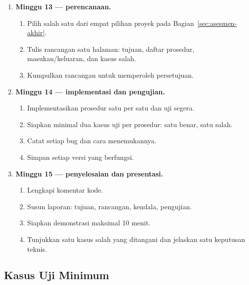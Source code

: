 \begin{enumerate}
    \item \textbf{Minggu 13 --- perencanaan.}
    \begin{enumerate}
        \item Pilih salah satu dari empat pilihan proyek pada
              Bagian~\ref{sec:asesmen-akhir}.
        \item Tulis rancangan satu halaman: tujuan, daftar prosedur,
              masukan/keluaran, dan kasus salah.
        \item Kumpulkan rancangan untuk memperoleh persetujuan.
    \end{enumerate}

    \item \textbf{Minggu 14 --- implementasi dan pengujian.}
    \begin{enumerate}
        \item Implementasikan prosedur satu per satu dan uji segera.
        \item Siapkan minimal dua kasus uji per prosedur: satu benar,
              satu salah.
        \item Catat setiap bug dan cara menemukannya.
        \item Simpan setiap versi  yang berfungsi.
    \end{enumerate}

    \item \textbf{Minggu 15 --- penyelesaian dan presentasi.}
    \begin{enumerate}
        \item Lengkapi komentar kode.
        \item Susun laporan: tujuan, rancangan, kendala, pengujian.
        \item Siapkan demonstrasi maksimal 10 menit.
        \item Tunjukkan satu kasus salah yang ditangani dan jelaskan
              satu keputusan teknis.
    \end{enumerate}
\end{enumerate}

\subsection{Kasus Uji Minimum}


